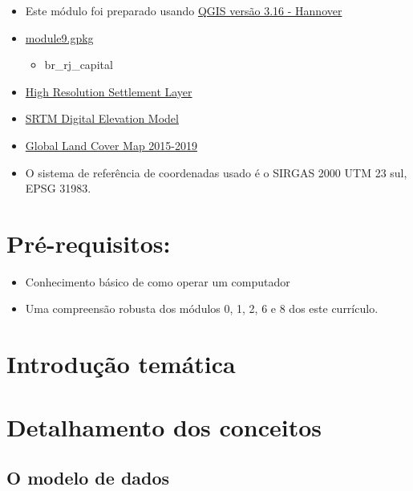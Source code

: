 \documentclass[
]{book}
\providecommand{\tightlist}{%
  \setlength{\itemsep}{0pt}\setlength{\parskip}{0pt}}
\begin{document}
\begin{itemize}
\tightlist
\item
  Este módulo foi preparado usando \href{https://qgis.org/en/site/forusers/download.html}{QGIS versão 3.16 - Hannover}
\item
  \href{data/module9.gpkg}{module9.gpkg}

  \begin{itemize}
  \tightlist
  \item
    br\_rj\_capital
  \end{itemize}
\item
  \href{data/hrsl_rj_capital_populacao.tif}{High Resolution Settlement Layer}
\item
  \href{data/SRTM_DEM}{SRTM Digital Elevation Model}
\item
  \href{data/Global_Land_Cover_Map}{Global Land Cover Map 2015-2019}
\item
  O sistema de referência de coordenadas usado é o SIRGAS 2000 UTM 23 sul, EPSG 31983.
\end{itemize}

\hypertarget{pruxe9-requisitos-9}{%
\section{Pré-requisitos:}\label{pruxe9-requisitos-9}}

\begin{itemize}
\tightlist
\item
  Conhecimento básico de como operar um computador
\item
  Uma compreensão robusta dos módulos 0, 1, 2, 6 e 8 dos este currículo.
\end{itemize}

\hypertarget{introduuxe7uxe3o-temuxe1tica-9}{%
\section{Introdução temática}\label{introduuxe7uxe3o-temuxe1tica-9}}

\hypertarget{detalhamento-dos-conceitos-6}{%
\section{Detalhamento dos conceitos}\label{detalhamento-dos-conceitos-6}}

\hypertarget{o-modelo-de-dados}{%
\subsection{O modelo de dados}\label{o-modelo-de-dados}}
\end{document}
